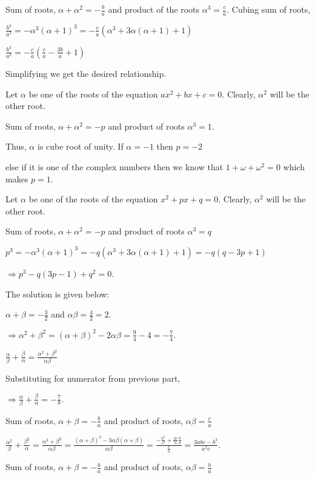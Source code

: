   Sum of roots, $\alpha + \alpha^2 = -\frac{b}{a}$ and product of the roots $\alpha^3 = \frac{c}{a}$. Cubing sum of roots,

  $\frac{b^3}{a^3} = -\alpha^3(\alpha + 1)^3 = -\frac{c}{a}(\alpha^3 + 3\alpha(\alpha + 1) + 1)$

  $\frac{b^3}{a^3} = -\frac{c}{a}\left(\frac{c}{a} - \frac{3b}{a} + 1\right)$

  Simplifying we get the desired relationship.
\item Let $\alpha$ be one of the roots of the equation $ax^2 + bx + c = 0$. Clearly, $\alpha^2$ will be the other root.

  Sum of roots, $\alpha + \alpha^2 = -p$ and product of roots $\alpha^3 = 1$.

  Thus, $\alpha$ is cube root of unity. If $\alpha = -1$ then $p = -2$

  else if it is one of the complex numbers then we know that $1 + \omega + \omega^2 = 0$ which makes $p =
  1$.
\item Let $\alpha$ be one of the roots of the equation $x^2 + px + q = 0$. Clearly, $\alpha^2$ will be the other root.

  Sum of roots, $\alpha + \alpha^2 = -p$ and product of roots $\alpha^3 = q$

  $p^3 = -\alpha^3(\alpha + 1)^3 = -q(\alpha^3 + 3\alpha(\alpha + 1) + 1) = -q(q - 3p + 1)$

  $\Rightarrow p^3 - q(3p - 1) + q^2 = 0$.
\item The solution is given below:
  \startitemize[i]
  \item $\alpha + \beta = -\frac{3}{2}$ and $\alpha\beta = \frac{4}{2} = 2$.

    $\Rightarrow \alpha^2 + \beta^2 = (\alpha + \beta)^2 - 2\alpha\beta = \frac{9}{4} - 4 = -\frac{7}{4}$.
  \item $\frac{\alpha}{\beta} + \frac{\beta}{\alpha} = \frac{\alpha^2 + \beta^2}{\alpha\beta}$

    Substituting for numerator from previous part,

    $\Rightarrow \frac{\alpha}{\beta} + \frac{\beta}{\alpha} = -\frac{7}{8}$.
  \stopitemize
\item Sum of roots, $\alpha + \beta = -\frac{b}{a}$ and product of roots, $\alpha\beta = \frac{c}{a}$

  $\frac{\alpha^2}{\beta} + \frac{\beta^2}{\alpha} = \frac{\alpha^3 + \beta^3}{\alpha\beta} =
  \frac{(\alpha + \beta)^3 - 3\alpha\beta(\alpha + \beta)}{\alpha\beta} = \frac{-\frac{b^3}{c^3} +
    \frac{3c}{a}\frac{b}{a}}{\frac{c}{a}} = \frac{3abc - b^3}{a^2c}$.
\item Sum of roots, $\alpha + \beta = -\frac{b}{a}$ and product of roots, $\alpha\beta = \frac{b}{a}$

